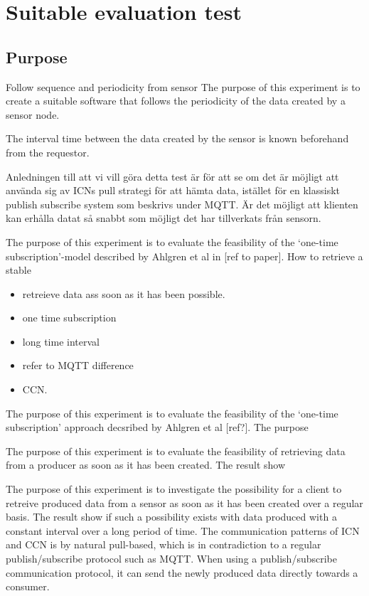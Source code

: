 \section{Suitable evaluation test}
\subsection{Purpose}
Follow sequence and periodicity from sensor
The purpose of this experiment is to create a suitable software that follows the periodicity of the data created by a sensor node.

The interval time between the data created by the sensor is known beforehand from the requestor.


Anledningen till att vi vill göra detta test är för att se om det är möjligt att använda sig av ICNs pull strategi för att hämta data, istället för en klassiskt publish subscribe system som beskrivs under MQTT. Är det möjligt att klienten kan erhålla datat så snabbt som möjligt det har tillverkats från sensorn. 

The purpose of this experiment is to evaluate the feasibility of the `one-time subscription'-model described by Ahlgren et al in [ref to paper]. How to retrieve a stable 



\begin{itemize}
\item retreieve data ass soon as it has been possible.
\item one time subscription
\item long time interval

\item refer to MQTT difference
\item CCN.
\end{itemize}
The purpose of this experiment is to evaluate the feasibility of the `one-time subscription' approach decsribed by Ahlgren et al [ref?]. 
The purpose 

The purpose of this experiment is to evaluate the feasibility of retrieving data from a producer as soon as it has been created. The result show 


The purpose of this experiment is to investigate the possibility for a client to retreive produced data from a sensor as soon as it has been created over a regular basis. The result show if such a possibility exists with data produced with a constant interval over a long period of time. 
The communication patterns of ICN and CCN is by natural pull-based, which is in contradiction to a regular publish/subscribe protocol such as MQTT. When using a publish/subscribe communication protocol, it can send the newly produced data directly towards a consumer. 

